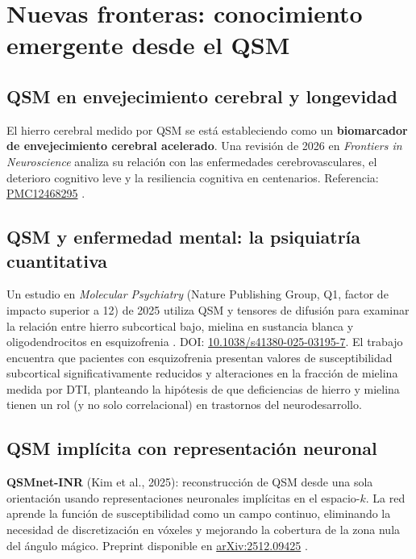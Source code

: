 \documentclass[12pt, a4paper]{article}
\begin{document}
\section{Nuevas fronteras: conocimiento emergente desde el QSM}

\subsection{QSM en envejecimiento cerebral y longevidad}

El hierro cerebral medido por QSM se está estableciendo como un \textbf{biomarcador de envejecimiento cerebral acelerado}. Una revisión de 2026 en \emph{Frontiers in Neuroscience} analiza su relación con las enfermedades cerebrovasculares, el deterioro cognitivo leve y la resiliencia cognitiva en centenarios. Referencia: \href{https://pmc.ncbi.nlm.nih.gov/articles/PMC12468295/}{PMC12468295} \cite{Aging2026QSM}.

\subsection{QSM y enfermedad mental: la psiquiatría cuantitativa}

Un estudio en \emph{Molecular Psychiatry} (Nature Publishing Group, Q1, factor de impacto superior a 12) de 2025 utiliza QSM y tensores de difusión para examinar la relación entre hierro subcortical bajo, mielina en sustancia blanca y oligodendrocitos en esquizofrenia \cite{Schizophrenia2025QSM}. DOI: \href{https://doi.org/10.1038/s41380-025-03195-7}{10.1038/s41380-025-03195-7}. El trabajo encuentra que pacientes con esquizofrenia presentan valores de susceptibilidad subcortical significativamente reducidos y alteraciones en la fracción de mielina medida por DTI, planteando la hipótesis de que deficiencias de hierro y mielina tienen un rol (y no solo correlacional) en trastornos del neurodesarrollo.

\subsection{QSM implícita con representación neuronal}

\textbf{QSMnet-INR} (Kim et al., 2025): reconstrucción de QSM desde una sola orientación usando representaciones neuronales implícitas en el espacio-$k$. La red aprende la función de susceptibilidad como un campo continuo, eliminando la necesidad de discretización en vóxeles y mejorando la cobertura de la zona nula del ángulo mágico. Preprint disponible en \href{https://arxiv.org/abs/2512.09425}{arXiv:2512.09425} \cite{QSMnetINR2025}.
\end{document}
